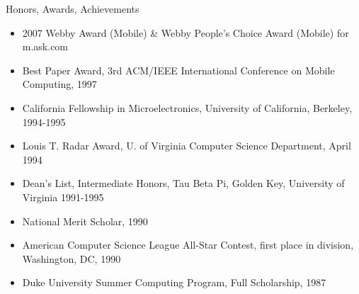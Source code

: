 
\begin{bf} \large
Honors, Awards, Achievements  \\[-16pt]
\end{bf}

\begin{itemize}
\item 2007 Webby Award (Mobile) \& Webby People’s Choice Award (Mobile) for m.ask.com \\[-18pt]
\item  Best Paper Award, 3rd ACM/IEEE International Conference on Mobile Computing, 1997 \\[-18pt]
\item  California Fellowship in Microelectronics, University of California, Berkeley, 1994-1995 \\[-18pt]
\item  Louis T. Radar Award, U. of Virginia Computer Science Department, April 1994 \\[-18pt]
\item  Dean's List, Intermediate Honors, Tau Beta Pi, Golden Key, University of Virginia 1991-1995 \\[-18pt]
\item  National Merit Scholar, 1990 \\[-18pt]
\item  American Computer Science League All-Star Contest, first place in division, Washington, DC, 1990 \\[-18pt]
\item    Duke University Summer Computing Program, Full Scholarship, 1987 \\
\end{itemize}








